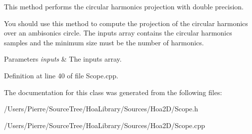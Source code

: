 This method performs the circular harmonics projection with double precision. 

You should use this method to compute the projection of the circular harmonics over an ambisonics circle. The inputs array contains the circular harmonics samples and the minimum size must be the number of harmonics.


\begin{DoxyParams}{Parameters}
{\em inputs} & The inputs array. \\
\hline
\end{DoxyParams}


Definition at line 40 of file Scope.\-cpp.



The documentation for this class was generated from the following files\-:\begin{DoxyCompactItemize}
\item 
/\-Users/\-Pierre/\-Source\-Tree/\-Hoa\-Library/\-Sources/\-Hoa2\-D/Scope.\-h\item 
/\-Users/\-Pierre/\-Source\-Tree/\-Hoa\-Library/\-Sources/\-Hoa2\-D/Scope.\-cpp\end{DoxyCompactItemize}

